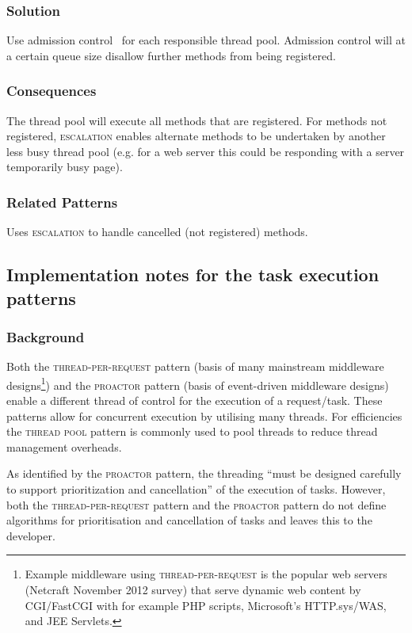 \documentclass[prodmode]{style/acmlarge}
\begin{document}
\subsubsection*{Solution} Use admission control~\cite{seda} for each responsible
thread pool.  Admission control will at a certain queue size disallow further
methods from being registered.

\subsubsection*{Consequences} The thread pool will execute all methods that are
registered.  For methods not registered, \textsc{escalation} enables alternate
methods to be undertaken by another less busy thread pool (e.g. for a web server
this could be responding with a server temporarily busy page).

\subsubsection*{Related Patterns} Uses \textsc{escalation} to handle cancelled
(not registered) methods.



\subsection{Implementation notes for the task execution patterns}

\subsubsection*{Background}

Both the \textsc{thread-per-request} pattern \cite{thread-per-request} (basis of
many mainstream middleware designs\footnote{Example middleware using
\textsc{thread-per-request} is the popular web servers (Netcraft November 2012
survey) that serve dynamic web content by CGI/FastCGI with for example PHP scripts,
Microsoft's HTTP.sys/WAS, and JEE Servlets.}) and the \textsc{proactor} pattern
\cite{proactor} (basis of event-driven middleware designs) enable a different
thread of control for the execution of a request/task.  These patterns allow for
concurrent execution by utilising many threads.  For efficiencies the
\textsc{thread pool} pattern \cite{thread-per-request} is commonly used to pool
threads to reduce thread management overheads.

As identified by the \textsc{proactor} pattern, the threading ``must be designed
carefully to support prioritization and cancellation'' \cite[p. 8]{proactor} of
the execution of tasks.  However, both the \textsc{thread-per-request} pattern and
the \textsc{proactor} pattern do not define algorithms for
prioritisation and cancellation of tasks and leaves this to the developer.
\end{document}
